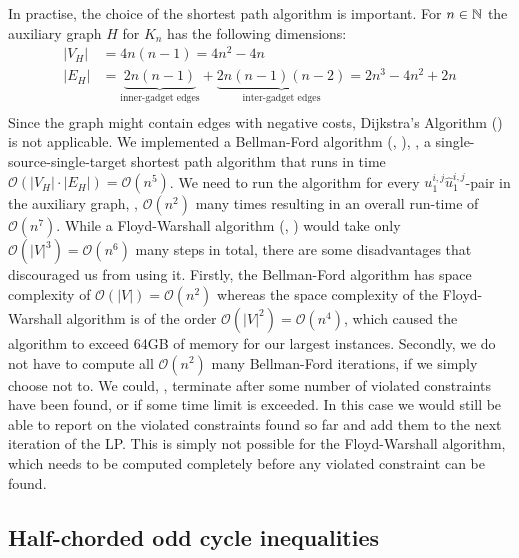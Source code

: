 In practise, the choice of the shortest path algorithm is important.
For $n \in \mathbb{N}$ the auxiliary graph $H$ for $K_{n}$ has the following dimensions:
\begin{align*}
	\lvert V_{H} \rvert &= 4 n(n-1) = 4n^{2} - 4n \\
	\lvert E_{H} \rvert &= \underbrace{2 n(n-1)}_{\text{inner-gadget edges}} + \underbrace{2 n(n-1)(n-2)}_{\text{inter-gadget edges}} = 2n^{3} - 4n^{2} + 2n \\
\end{align*}
Since the graph might contain edges with negative costs, Dijkstra’s Algorithm (\cite{dijkstraNoteTwoProblems1959}) is not applicable.
We implemented a Bellman-Ford algorithm (\cite{bellmanRoutingProblem1958}, \cite{fordNetworkFlowTheory1956}), \ie, a single-source-single-target shortest path algorithm that runs in time $\mathcal{O}(\lvert V_{H} \rvert \cdot \lvert E_{H} \rvert) = \mathcal{O}(n^{5})$.
We need to run the algorithm for every $u_{1}^{i,j}\hat{u}_{1}^{i,j}$-pair in the auxiliary graph, \ie, $\mathcal{O}(n^{2})$ many times resulting in an overall run-time of $\mathcal{O}(n^{7})$.
While a Floyd-Warshall algorithm (\cite{floydAlgorithm97Shortest1962}, \cite{warshallTheoremBooleanMatrices1962}) would take only $\mathcal{O}(\lvert V \rvert^3) = \mathcal{O}(n^{6})$ many steps in total, there are some disadvantages that discouraged us from using it.
Firstly, the Bellman-Ford algorithm has space complexity of $\mathcal{O}(\lvert V \rvert) = \mathcal{O}(n^{2})$ whereas the space complexity of the Floyd-Warshall algorithm is of the order $\mathcal{O}(\lvert V \rvert^{2}) = \mathcal{O}(n^{4})$, which caused the algorithm to exceed 64GB of memory for our largest instances.
Secondly, we do not have to compute all $\mathcal{O}(n^{2})$ many Bellman-Ford iterations, if we simply choose not to.
We could, \eg, terminate after some number of violated constraints have been found, or if some time limit is exceeded.
In this case we would still be able to report on the violated constraints found so far and add them to the next iteration of the LP.
This is simply not possible for the Floyd-Warshall algorithm, which needs to be computed completely before any violated constraint can be found.


\subsection{Half-chorded odd cycle inequalities}\label{subsec:half_chorded_separator}

